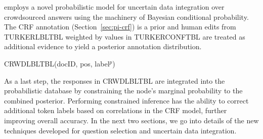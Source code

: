 \sysName employs a novel probabilistic model for uncertain data integration over crowdsourced answers using the machinery of Bayesian conditional probability.  The CRF annotation (Section~\ref{sec:pi-crf}) is a prior and human edits from T{\small URKER}L{\small BL}T{\small BL} weighted by values in T{\small URKER}C{\small ONF}T{\small BL} are treated as additional evidence to yield a posterior annotation distribution.

\vspace{.1in}
\centerline{C{\small RWD}L{\small BL}T{\small BL}(docID, pos, label$^{p}$)}
\vspace{.1in}

As a last step, the responses in C{\small RWD}L{\small BL}T{\small BL} are integrated into the probabilistic database by constraining the node's marginal probability to the combined posterior.  Performing constrained inference has the ability to correct additional token labels based on correlations in the CRF model, further improving overall accuracy.  In the next two sections, we go into details of the new techniques developed for question selection and uncertain data integration.


